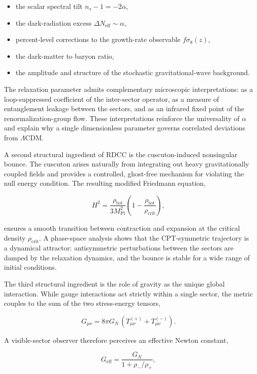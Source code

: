 \documentclass[11pt,a4paper]{article}
\begin{document}
\begin{itemize}
    \item the scalar spectral tilt \(n_{s} - 1 = -2\alpha\),
    \item the dark-radiation excess \(\Delta N_{\mathrm{eff}} \sim \alpha\),
    \item percent-level corrections to the growth-rate observable \(f\sigma_{8}(z)\),
    \item the dark-matter to baryon ratio,
    \item the amplitude and structure of the stochastic gravitational-wave background.
\end{itemize}

The relaxation parameter admits complementary microscopic interpretations: as a
loop-suppressed coefficient of the inter-sector operator, as a measure of
entanglement leakage between the sectors, and as an infrared fixed point of the
renormalization-group flow. These interpretations reinforce the universality of
\(\alpha\) and explain why a single dimensionless parameter governs correlated
deviations from \(\Lambda\)CDM.

A second structural ingredient of RDCC is the cuscuton-induced nonsingular
bounce. The cuscuton arises naturally from integrating out heavy
gravitationally coupled fields and provides a controlled, ghost-free mechanism
for violating the null energy condition. The resulting modified Friedmann
equation,

\[
H^{2}
    = \frac{\rho_{\mathrm{tot}}}{3M_{\mathrm{Pl}}^{2}}
      \left(1 - \frac{\rho_{\mathrm{tot}}}{\rho_{\mathrm{crit}}}\right),
\]

ensures a smooth transition between contraction and expansion at the critical
density \(\rho_{\mathrm{crit}}\). A phase-space analysis shows that the
CPT-symmetric trajectory is a dynamical attractor: antisymmetric perturbations
between the sectors are damped by the relaxation dynamics, and the bounce is
stable for a wide range of initial conditions.

The third structural ingredient is the role of gravity as the unique global
interaction. While gauge interactions act strictly within a single sector, the
metric couples to the sum of the two stress-energy tensors,

\[
G_{\mu\nu}
    = 8\pi G_{N}\,(T^{(+)}_{\mu\nu} + T^{(-)}_{\mu\nu}).
\]

A visible-sector observer therefore perceives an effective Newton constant,

\[
G_{\mathrm{eff}}
    = \frac{G_{N}}{1 + \rho_{-}/\rho_{+}},
\]
\end{document}
